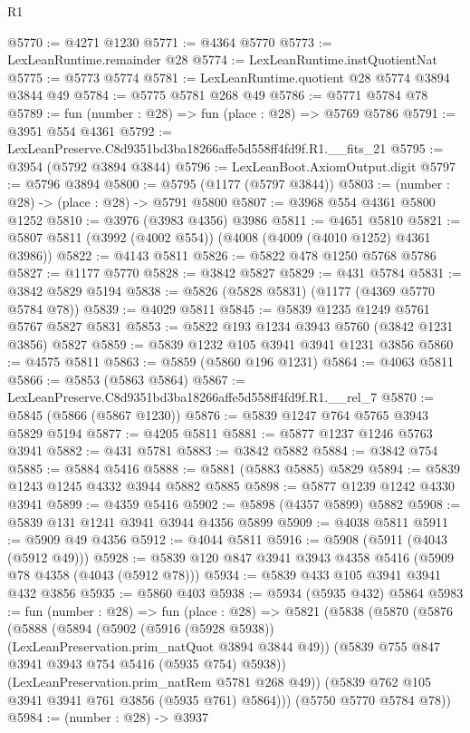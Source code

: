 \begin{lexlean}{R1}
\begin{coremodule}
@5770 := @4271 @1230
@5771 := @4364 @5770
@5773 := LexLeanRuntime.remainder @28
@5774 := LexLeanRuntime.instQuotientNat
@5775 := @5773 @5774
@5781 := LexLeanRuntime.quotient @28 @5774 @3894 @3844 @49
@5784 := @5775 @5781 @268 @49
@5786 := @5771 @5784 @78
@5789 := fun (number : @28) => fun (place : @28) => @5769 @5786
@5791 := @3951 @554 @4361
@5792 := LexLeanPreserve.C8d9351bd3ba18266affe5d558ff4fd9f.R1.__fits_21
@5795 := @3954 (@5792 @3894 @3844)
@5796 := LexLeanBoot.AxiomOutput.digit
@5797 := @5796 @3894
@5800 := @5795 (@1177 (@5797 @3844))
@5803 := (number : @28) -> (place : @28) -> @5791 @5800
@5807 := @3968 @554 @4361 @5800 @1252
@5810 := @3976 (@3983 @4356) @3986
@5811 := @4651 @5810
@5821 := @5807 @5811 (@3992 (@4002 @554)) (@4008 (@4009 (@4010 @1252) @4361 @3986))
@5822 := @4143 @5811
@5826 := @5822 @478 @1250 @5768 @5786
@5827 := @1177 @5770
@5828 := @3842 @5827
@5829 := @431 @5784
@5831 := @3842 @5829 @5194
@5838 := @5826 (@5828 @5831) (@1177 (@4369 @5770 @5784 @78))
@5839 := @4029 @5811
@5845 := @5839 @1235 @1249 @5761 @5767 @5827 @5831
@5853 := @5822 @193 @1234 @3943 @5760 (@3842 @1231 @3856) @5827
@5859 := @5839 @1232 @105 @3941 @3941 @1231 @3856
@5860 := @4575 @5811
@5863 := @5859 (@5860 @196 @1231)
@5864 := @4063 @5811
@5866 := @5853 (@5863 @5864)
@5867 := LexLeanPreserve.C8d9351bd3ba18266affe5d558ff4fd9f.R1.__rel_7
@5870 := @5845 (@5866 (@5867 @1230))
@5876 := @5839 @1247 @764 @5765 @3943 @5829 @5194
@5877 := @4205 @5811
@5881 := @5877 @1237 @1246 @5763 @3941
@5882 := @431 @5781
@5883 := @3842 @5882
@5884 := @3842 @754
@5885 := @5884 @5416
@5888 := @5881 (@5883 @5885) @5829
@5894 := @5839 @1243 @1245 @4332 @3944 @5882 @5885
@5898 := @5877 @1239 @1242 @4330 @3941
@5899 := @4359 @5416
@5902 := @5898 (@4357 @5899) @5882
@5908 := @5839 @131 @1241 @3941 @3944 @4356 @5899
@5909 := @4038 @5811
@5911 := @5909 @49 @4356
@5912 := @4044 @5811
@5916 := @5908 (@5911 (@4043 (@5912 @49)))
@5928 := @5839 @120 @847 @3941 @3943 @4358 @5416 (@5909 @78 @4358 (@4043 (@5912 @78)))
@5934 := @5839 @433 @105 @3941 @3941 @432 @3856
@5935 := @5860 @403
@5938 := @5934 (@5935 @432) @5864
@5983 := fun (number : @28) =>
  fun (place : @28) =>
  @5821
    (@5838
      (@5870
        (@5876
          (@5888
            (@5894
              (@5902 (@5916 (@5928 @5938)) (LexLeanPreservation.prim_natQuot @3894 @3844 @49))
              (@5839 @755 @847 @3941 @3943 @754 @5416 (@5935 @754) @5938))
            (LexLeanPreservation.prim_natRem @5781 @268 @49))
          (@5839 @762 @105 @3941 @3941 @761 @3856 (@5935 @761) @5864)))
      (@5750 @5770 @5784 @78))
@5984 := (number : @28) -> @3937

\end{coremodule}
\end{lexlean}
